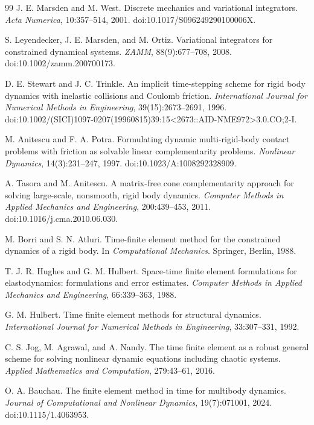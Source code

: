 \documentclass[10pt]{article}
\begin{document}
\begin{thebibliography}{99}
J. E. Marsden and M. West.
Discrete mechanics and variational integrators.
\emph{Acta Numerica}, 10:357--514, 2001.
doi:10.1017/S096249290100006X.

S. Leyendecker, J. E. Marsden, and M. Ortiz.
Variational integrators for constrained dynamical systems.
\emph{ZAMM}, 88(9):677--708, 2008.
doi:10.1002/zamm.200700173.

D. E. Stewart and J. C. Trinkle.
An implicit time-stepping scheme for rigid body dynamics with inelastic
collisions and Coulomb friction.
\emph{International Journal for Numerical Methods in Engineering},
39(15):2673--2691, 1996.
doi:10.1002/(SICI)1097-0207(19960815)39:15<2673::AID-NME972>3.0.CO;2-I.

M. Anitescu and F. A. Potra.
Formulating dynamic multi-rigid-body contact problems with friction as
solvable linear complementarity problems.
\emph{Nonlinear Dynamics}, 14(3):231--247, 1997.
doi:10.1023/A:1008292328909.

A. Tasora and M. Anitescu.
A matrix-free cone complementarity approach for solving large-scale,
nonsmooth, rigid body dynamics.
\emph{Computer Methods in Applied Mechanics and Engineering}, 200:439--453,
2011.
doi:10.1016/j.cma.2010.06.030.

M. Borri and S. N. Atluri.
Time-finite element method for the constrained dynamics of a rigid body.
In \emph{Computational Mechanics}. Springer, Berlin, 1988.

T. J. R. Hughes and G. M. Hulbert.
Space-time finite element formulations for elastodynamics: formulations and
error estimates.
\emph{Computer Methods in Applied Mechanics and Engineering}, 66:339--363,
1988.

G. M. Hulbert.
Time finite element methods for structural dynamics.
\emph{International Journal for Numerical Methods in Engineering}, 33:307--331,
1992.

C. S. Jog, M. Agrawal, and A. Nandy.
The time finite element as a robust general scheme for solving nonlinear
dynamic equations including chaotic systems.
\emph{Applied Mathematics and Computation}, 279:43--61, 2016.

O. A. Bauchau.
The finite element method in time for multibody dynamics.
\emph{Journal of Computational and Nonlinear Dynamics}, 19(7):071001, 2024.
doi:10.1115/1.4063953.


\end{thebibliography}
\end{document}
